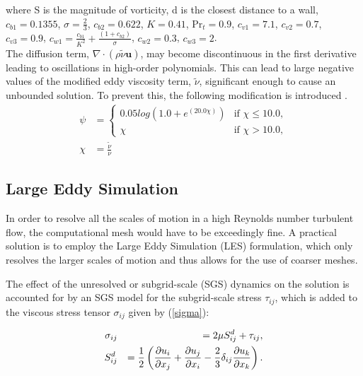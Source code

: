 where S is the magnitude of vorticity, d is the closest distance to a wall, $c_{b1} = 0.1355$, $\sigma = \frac{2}{3}$, $c_{b2} = 0.622$, $K = 0.41$, $\text{Pr}_t = 0.9$, $c_{v1} = 7.1$, $c_{v2} = 0.7$, $c_{v3} = 0.9$, $c_{w1} = \frac{c_{b1}}{K^2} + \frac{(1+c_{b2})}{\sigma}$, $c_{w2} = 0.3$, $c_{w3} = 2$.\\

The diffusion term, $\nabla\cdot(\rho\tilde\nu\boldsymbol{u})$, may become discontinuous in the first derivative leading to oscillations in high-order polynomials. This can lead to large negative values of the modified eddy viscosity term, $\tilde\nu$, significant enough to cause an unbounded solution. To prevent this, the following modification is introduced \cite{moro2011navier}.
\begin{align}
	\psi &=
	\begin{cases}
	   0.05log(1.0 + e^{(20.0\chi)}) & \text{if } \chi \le 10.0, \\
	   \chi & \text{if } \chi > 10.0,
	\end{cases} \\
	\chi &= \frac{\tilde\nu}{\nu}
\end{align}

\subsection{Large Eddy Simulation}\label{lesmodels}

In order to resolve all the scales of motion in a high Reynolds number turbulent flow, the computational mesh would have to be exceedingly fine.
A practical solution is to employ the Large Eddy Simulation (LES) formulation, which only resolves the larger scales of motion and thus allows for the use of coarser meshes.

The effect of the unresolved or subgrid-scale (SGS) dynamics on the solution is accounted for by an SGS model for the subgrid-scale stress $\tau_{ij}$, which is added to the viscous stress tensor $\sigma_{ij}$ given by (\ref{sigma}):

\begin{eqnarray}\label{tausgs}
\sigma_{ij} &&= 2 \mu S^d_{ij} + \tau_{ij},\\
S^d_{ij} &&= \frac 1 2 \left( \frac{\partial u_i}{\partial x_j} + \frac{\partial u_j}{\partial x_i} - \frac{2}{3} \delta_{ij}\frac{\partial u_k}{\partial x_k} \right).
\end{eqnarray}

